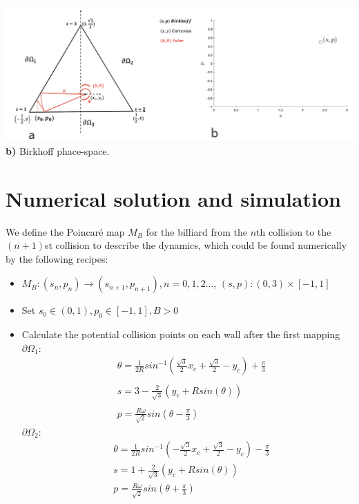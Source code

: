 \documentclass[a0,portrait]{a0poster}
\begin{document}
\begin{multicols}{3}
\begin{center}\vspace{1cm}
    \includegraphics[width=0.8\linewidth]{composite2.png}
     \textbf{b)} Birkhoff phace-space.
    \label{fig:composite2}
\end{center}%


\section*{Numerical solution and simulation}

\noindent
We define the Poincaré map $M_B$ for the billiard from the $n$th collision to the $(n+1)$st collision to describe the dynamics, which could be found numerically by the following recipes:
\begin{itemize}
    \item $M_B: (s_n, p_n) \to (s_{n+1},p_{n+1}), n=0, 1, 2...$, $(s,p): (0, 3) \times [-1, 1]$
    \item Set $s_0 \in (0, 1),p_0 \in [-1,1], B>0$
    \item Calculate the potential collision points on each wall after the first mapping\\
$\partial \Omega_1$:
\begin{equation}
\begin{aligned}
& \theta=\frac{1}{2R}sin^{-1}(\frac{\sqrt{3}}{2}x_c+\frac{\sqrt{3}}{2}-y_c)+\frac{\pi}{3}\\
\\
& s=3-\frac{2}{\sqrt{3}}(y_c+Rsin(\theta))\\
\\
& p=\frac{R\omega}{\sqrt{2}}sin(\theta-\frac{\pi}{3})
\end{aligned}
\end{equation}
$\partial \Omega_2$:
\begin{equation}
\begin{aligned}
& \theta=\frac{1}{2R}sin^{-1}(-\frac{\sqrt{3}}{2}x_c+\frac{\sqrt{3}}{2}-y_c)-\frac{\pi}{3}\\
& s=1+\frac{2}{\sqrt{3}}(y_c+Rsin(\theta))\\
& p=\frac{R\omega}{\sqrt{2}}sin(\theta+\frac{\pi}{3})
\end{aligned}
\end{equation}


\end{itemize}
\end{multicols}
\end{document}

